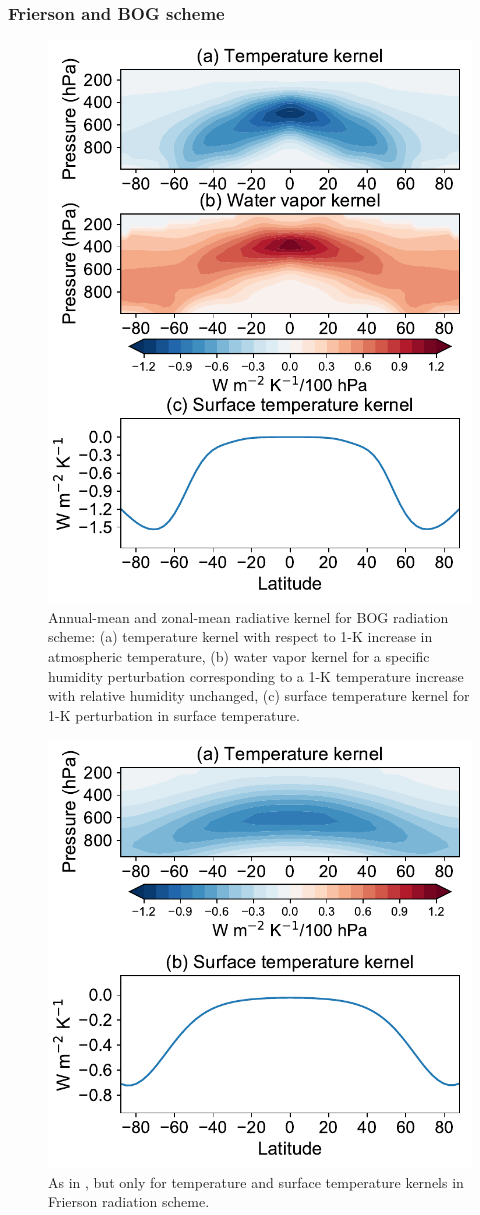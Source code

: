 \subsubsection{Frierson and BOG scheme}
\begin{figure}[ht]
	\centering
	\includegraphics[width=.6\linewidth]{figs/polar_amp/kernels_byrne}
	\caption{Annual-mean and zonal-mean radiative kernel for BOG radiation scheme: (a) temperature kernel with respect to 1-K increase in atmospheric temperature, (b) water vapor kernel for a specific humidity perturbation corresponding to a 1-K temperature increase with relative humidity unchanged, (c) surface temperature kernel for 1-K perturbation in surface temperature.}
	\label{fig:bog_kernels}
\end{figure}

\begin{figure}[ht]
	\centering
	\includegraphics[width=.6\linewidth]{figs/polar_amp/kernels_frierson}
	\caption{As in , but only for temperature and surface temperature kernels in Frierson radiation scheme.}
	\label{fig:frierson_kernels}
\end{figure}

